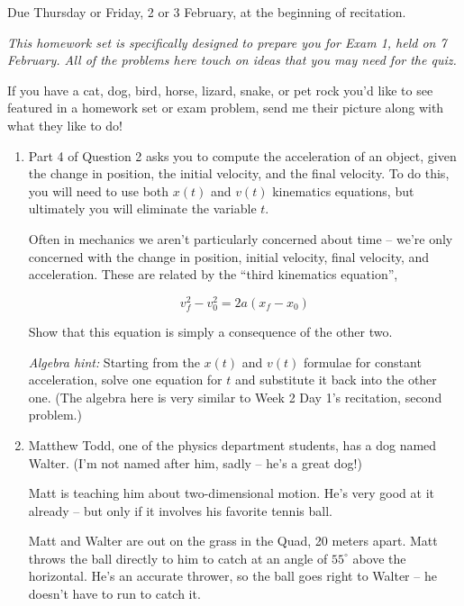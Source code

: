 \documentclass[12pt]{article}
\begin{document}
\Large
\centerline{}


\begin{center} \normalsize Due Thursday or Friday, 2 or 3 February, at the beginning of recitation. 
\end{center}
\normalsize

\it This homework set is specifically designed to prepare you for Exam 1, held on 7 February. All of the problems here touch on ideas that you may need for the quiz. 

If you have a cat, dog, bird, horse, lizard, snake, or pet rock you'd like to see featured in a homework set or exam problem, send me their picture along with what they like to do!

\rm
\begin{enumerate}

\item Part 4 of Question 2 asks you to compute the acceleration of an object, given the change in position, the initial velocity, and the final velocity. To do this, you will need to use both $x(t)$ and $v(t)$ kinematics equations, but ultimately you will eliminate the variable $t$.

Often in mechanics we aren't particularly concerned about time -- we're only concerned with the change in position, initial velocity, final velocity, and acceleration.
These are related by the ``third kinematics equation'', 

$$
v_f^2 - v_0^2 = 2a(x_f - x_0)
$$

Show that this equation is simply a consequence of the other two.

{\it Algebra hint:} Starting from the $x(t)$ and $v(t)$ formulae for constant acceleration, solve one equation for $t$ and substitute it back into the other one. (The algebra here is very similar to Week 2 Day 1's recitation, second problem.)

\bigskip

\item Matthew Todd, one of the physics department students, has a dog named Walter. (I'm not named after him, sadly -- he's a great dog!) 

\begin{minipage}{0.5\textwidth}Matt is teaching him about two-dimensional motion. He's very good at it already -- but only if it involves his favorite tennis ball.

\bigskip

Matt and Walter are out on the grass in the Quad, 20 meters apart. Matt throws the ball directly to him to catch at an angle of $55^\circ$ above the horizontal. He's an accurate thrower, so the ball goes right to Walter -- he doesn't have to run to catch it. 


\end{minipage}
\end{enumerate}
\end{document}
